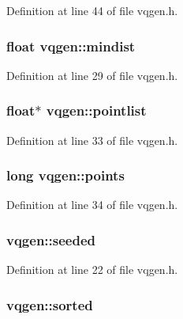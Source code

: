 Definition at line 44 of file vqgen.\+h.

\subsubsection[{\texorpdfstring{mindist}{mindist}}]{\setlength{\rightskip}{0pt plus 5cm}float vqgen\+::mindist}\hypertarget{structvqgen_aa72b518c7597827d46cadcbf321ae176}{}\label{structvqgen_aa72b518c7597827d46cadcbf321ae176}


Definition at line 29 of file vqgen.\+h.

\subsubsection[{\texorpdfstring{pointlist}{pointlist}}]{\setlength{\rightskip}{0pt plus 5cm}float$\ast$ vqgen\+::pointlist}\hypertarget{structvqgen_ab8f1a19f76873f65c36500d1ddf9a44d}{}\label{structvqgen_ab8f1a19f76873f65c36500d1ddf9a44d}


Definition at line 33 of file vqgen.\+h.

\subsubsection[{\texorpdfstring{points}{points}}]{\setlength{\rightskip}{0pt plus 5cm}long vqgen\+::points}\hypertarget{structvqgen_a95e0e94fc47cf59d894937e2a5695fec}{}\label{structvqgen_a95e0e94fc47cf59d894937e2a5695fec}


Definition at line 34 of file vqgen.\+h.

\subsubsection[{\texorpdfstring{seeded}{seeded}}]{ vqgen\+::seeded}\hypertarget{structvqgen_a38dc058d04e964502a0bf9720cc65e07}{}\label{structvqgen_a38dc058d04e964502a0bf9720cc65e07}


Definition at line 22 of file vqgen.\+h.

\subsubsection[{\texorpdfstring{sorted}{sorted}}]{ vqgen\+::sorted}\hypertarget{structvqgen_a9593a45a916e6dc0d0be9d90560f627a}{}\label{structvqgen_a9593a45a916e6dc0d0be9d90560f627a}


